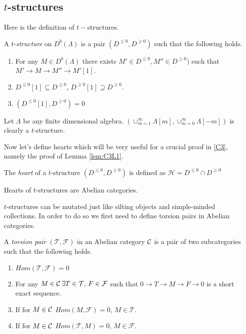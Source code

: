 \subsection{$t$-structures}
\indent Here is the definition of $t-$structures.
\begin{definition}
A $t$-\textit{structure} on $D^b(\Lambda)$ is a pair $(D^{\leq 0},D^{\geq 0})$ such that the following holds.
\begin{enumerate}
\item For any $M\in D^b(\Lambda)$ there exists $M'\in D^{\leq 0}, M''\in D^{\geq 0})$ such that $M'\to M\to M''\to M'[1]$.
\item $D^{\leq 0}[1]\subseteq D^{\leq 0}$,  $D^{\geq 0}[1]\supseteq D^{\geq 0}$.
\item $(D^{\leq 0}[1], D^{\geq 0}) = 0$
\end{enumerate}
\end{definition}
\begin{example}
Let $\Lambda$ be any finite dimensional algebra. $(\cup_{m=1}^{\infty}\Lambda[m], \cup_{m=0}^{\infty}\Lambda[-m])$ is clearly a $t$-structure.
\end{example}
\indent Now let's define hearts which will be very useful for a crucial proof in \ref{C3}, namely the proof of Lemma \ref{lem:C3L1}.
\begin{definition}
The \textit{heart} of a $t$-structure $(D^{\leq 0},D^{\geq 0})$ is defined as $\mathcal{H} = D^{\leq 0}\cap D^{\geq 0}$
\end{definition}
\begin{theorem}
\cite{BBD} Hearts of $t$-structures are Abelian categories. 
\end{theorem}
\indent $t$-structures can be mutated just like silting objects and simple-minded collections. In order to do so we first need to define torsion pairs in Abelian categories.\\
\begin{definition}
A \textit{torsion pair} $(\mathcal{T},\mathcal{F})$ in an Abelian category $\mathcal{C}$ is a pair of two subcategories such that the following holds.
\begin{enumerate}
\item $Hom(\mathcal{T},\mathcal{F}) = 0$
\item For any $M\in\mathcal{C}\,\exists T\in\mathcal{T},\, F\in\mathcal{F}$ such that $0\to T\to M\to F\to 0$ is a short exact sequence.
\item If for $M\in\mathcal{C}$ $Hom(M,\mathcal{F}) = 0$, $M\in\mathcal{T}$.
\item If for $M\in\mathcal{C}$ $Hom(\mathcal{T}, M) = 0$, $M\in\mathcal{F}$.
\end{enumerate}
\end{definition}
